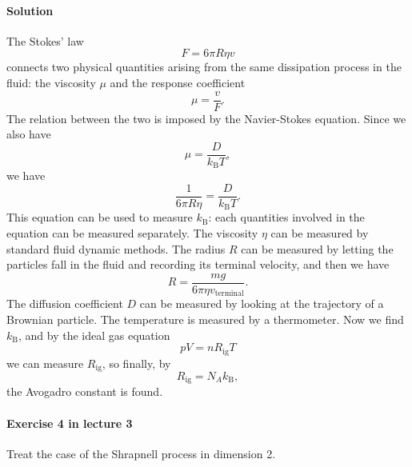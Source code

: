 \documentclass[hyperref, a4paper]{article}
\begin{document}
\paragraph{Solution} The Stokes' law 
\begin{equation}
    F = 6 \pi R \eta v 
\end{equation}
connects two physical quantities arising from the same dissipation process in the fluid:
the viscosity $\mu$ and the response coefficient
\begin{equation}
    \mu = \frac{v}{F}.
\end{equation}
The relation between the two is imposed by the Navier-Stokes equation.
Since we also have 
\begin{equation}
    \mu = \frac{D}{k_{\text{B}} T},
\end{equation}
we have 
\begin{equation}
    \frac{1}{6 \pi R \eta} = \frac{D}{k_{\text{B}} T}.
\end{equation}
This equation can be used to measure $k_{\text{B}}$:
each quantities involved in the equation can be measured separately.
The viscosity $\eta$ can be measured by standard fluid dynamic methods.
The radius $R$ can be measured by letting the particles fall in the fluid 
and recording its terminal velocity,
and then we have 
\begin{equation}
    R = \frac{mg}{6 \pi \eta v_{\text{terminal}}}.
\end{equation}
The diffusion coefficient $D$ can be measured by looking at the trajectory of a Brownian particle.
The temperature is measured by a thermometer.
Now we find $k_{\text{B}}$,
and by the ideal gas equation 
\begin{equation}
    p V = n R_{\text{ig}} T
\end{equation}
we can measure $R_{\text{ig}}$,
so finally, by 
\begin{equation}
    R_{\text{ig}} = N_A k_{\text{B}},
\end{equation}
the Avogadro constant is found.

\paragraph{Exercise 4 in lecture 3} Treat the case of the Shrapnell process in dimension 2.
\end{document}
